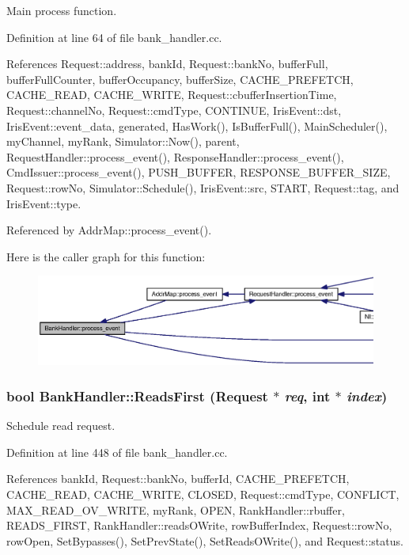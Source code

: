 Main process function. 



Definition at line 64 of file bank\_\-handler.cc.

References Request::address, bankId, Request::bankNo, bufferFull, bufferFullCounter, bufferOccupancy, bufferSize, CACHE\_\-PREFETCH, CACHE\_\-READ, CACHE\_\-WRITE, Request::cbufferInsertionTime, Request::channelNo, Request::cmdType, CONTINUE, IrisEvent::dst, IrisEvent::event\_\-data, generated, HasWork(), IsBufferFull(), MainScheduler(), myChannel, myRank, Simulator::Now(), parent, RequestHandler::process\_\-event(), ResponseHandler::process\_\-event(), CmdIssuer::process\_\-event(), PUSH\_\-BUFFER, RESPONSE\_\-BUFFER\_\-SIZE, Request::rowNo, Simulator::Schedule(), IrisEvent::src, START, Request::tag, and IrisEvent::type.

Referenced by AddrMap::process\_\-event().

Here is the caller graph for this function:\nopagebreak
\begin{figure}[H]
\begin{center}
\leavevmode
\includegraphics[width=420pt]{classBankHandler_ff84a6f67d0bffbe69b069d7f2e718af_icgraph}
\end{center}
\end{figure}
\subsubsection[{ReadsFirst}]{\setlength{\rightskip}{0pt plus 5cm}bool BankHandler::ReadsFirst ({\bf Request} $\ast$ {\em req}, \/  int $\ast$ {\em index})}\label{classBankHandler_e9a0e0abbb74e6f7b3d8de3421d3e81c}


Schedule read request. 



Definition at line 448 of file bank\_\-handler.cc.

References bankId, Request::bankNo, bufferId, CACHE\_\-PREFETCH, CACHE\_\-READ, CACHE\_\-WRITE, CLOSED, Request::cmdType, CONFLICT, MAX\_\-READ\_\-OV\_\-WRITE, myRank, OPEN, RankHandler::rbuffer, READS\_\-FIRST, RankHandler::readsOWrite, rowBufferIndex, Request::rowNo, rowOpen, SetBypasses(), SetPrevState(), SetReadsOWrite(), and Request::status.

